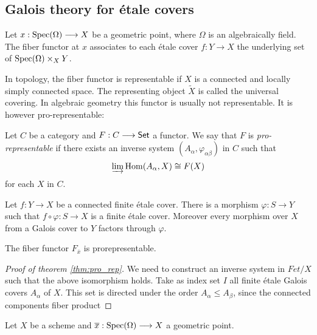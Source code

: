 \subsection{Galois theory for \'etale covers}
\begin{definition}
	Let $x: \operatorname{Spec}(\Omega) \longrightarrow X$ be a geometric point, where $\Omega$ is an algebraically field. The fiber functor at $x$ associates to each \'etale cover $f: Y \to X$ the underlying set of $\operatorname{Spec}(\Omega) \times_X Y$.
\end{definition}

\begin{remark}
	In topology, the fiber functor is representable if $X$ is a connected and locally simply connected space. The representing object $\tilde{X}$ is called the universal covering. In algebraic geometry this functor is usually not representable. It is however pro-representable:
\end{remark}

\begin{definition}
	Let $C$ be a category and $F: C \longrightarrow \mathsf{Set}$ a functor. We say that $F$ is \textit{pro-representable} if there exists an \Gls{inverse system} $(A_\alpha,\varphi_{\alpha \beta})$ in $C$ such that
	\[
		\varinjlim \operatorname{Hom}(A_\alpha, X) \cong F(X)
	\]
	for each $X$ in $C$.
\end{definition}
\begin{lemma}
	Let $f: Y \to X$ be a connected finite \'etale cover. There is a morphism $\varphi: S \to Y$ such that $f \circ \varphi: S \to X$ is a finite \'etale cover. Moreover every morphism over $X$ from a Galois cover to $Y$ factors through $\varphi$.
\end{lemma}

\begin{theorem}\label{thm:pro_rep}
	The fiber functor $F_{\overline{x}}$ is prorepresentable.
\end{theorem}
\begin{proof}[Proof of theorem \ref{thm:pro_rep}]
	We need to construct an inverse system in $Fet/X$ such that the above isomorphism holds. Take as index set $I$ all finite \'etale Galois covers $A_\alpha$ of $X$. This set is directed under the order $A_\alpha \le A_\beta$, since the connected components fiber product
\end{proof}

\begin{theorem}
	Let $X$ be a scheme and $\overline{x} : \operatorname{Spec}(\Omega) \longrightarrow X$ a geometric point.
\end{theorem}

